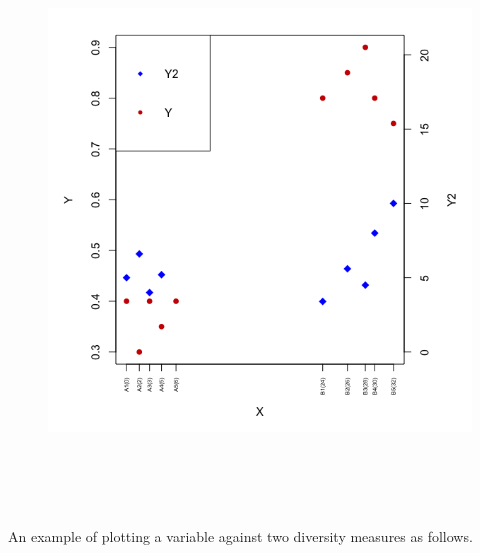 \documentclass[12pt]{article}\usepackage[]{graphicx}\usepackage[usenames,dvipsnames]{color}
\begin{document}
\begin{figure}[htp]
\begin{center}
\includegraphics[width=6in,height=6in]{figure/topic_meta_meta.png}
\end{center}
\end{figure}


An example of plotting  a variable against two diversity measures as follows.
\end{document}
